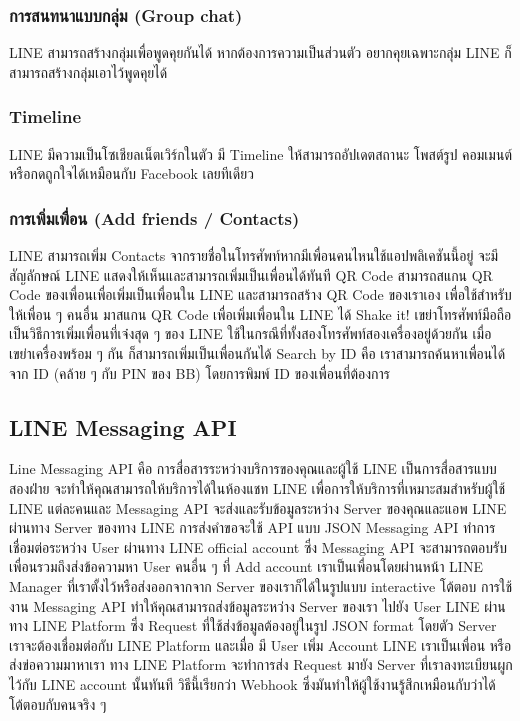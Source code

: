 \subsubsection{การสนทนาแบบกลุ่ม (Group chat)} 
\quad LINE สามารถสร้างกลุ่มเพื่อพูดคุยกันได้ หากต้องการความเป็นส่วนตัว อยากคุยเฉพาะกลุ่ม LINE ก็สามารถสร้างกลุ่มเอาไว้พูดคุยได้ 
\subsubsection{Timeline} 
\quad LINE มีความเป็นโซเชียลเน็ตเวิร์กในตัว มี Timeline ให้สามารถอัปเดตสถานะ โพสต์รูป คอมเมนต์ หรือกดถูกใจได้เหมือนกับ Facebook เลยทีเดียว 
\subsubsection{การเพิ่มเพื่อน (Add friends / Contacts)}
\quad LINE สามารถเพิ่ม Contacts จากรายชื่อในโทรศัพท์หากมีเพื่อนคนไหนใช้แอปพลิเคชันนี้อยู่ จะมีสัญลักษณ์ LINE แสดงให้เห็นและสามารถเพิ่มเป็นเพื่อนได้ทันที QR Code สามารถสแกน QR Code ของเพื่อนเพื่อเพิ่มเป็นเพื่อนใน LINE และสามารถสร้าง QR Code ของเราเอง เพื่อใช้สำหรับให้เพื่อน ๆ คนอื่น มาสแกน QR Code เพื่อเพิ่มเพื่อนใน LINE ได้ Shake it! เขย่าโทรศัพท์มือถือ เป็นวิธีการเพิ่มเพื่อนที่เจ๋งสุด ๆ ของ LINE ใช้ในกรณีที่ทั้งสองโทรศัพท์สองเครื่องอยู่ด้วยกัน เมื่อเขย่าเครื่องพร้อม ๆ กัน ก็สามารถเพิ่มเป็นเพื่อนกันได้ Search by ID คือ เราสามารถค้นหาเพื่อนได้จาก ID (คล้าย ๆ กับ PIN ของ BB) โดยการพิมพ์ ID ของเพื่อนที่ต้องการ 

\subsection{LINE Messaging API} 
\quad Line Messaging API คือ การสื่อสารระหว่างบริการของคุณและผู้ใช้ LINE เป็นการสื่อสารแบบสองฝ่าย จะทำให้คุณสามารถให้บริการได้ในห้องแชท LINE เพื่อการให้บริการที่เหมาะสมสำหรับผู้ใช้ LINE แต่ละคนและ Messaging API จะส่งและรับข้อมูลระหว่าง Server ของคุณและแอพ LINE ผ่านทาง Server ของทาง LINE การส่งคำขอจะใช้ API แบบ JSON Messaging API ทำการเชื่อมต่อระหว่าง User ผ่านทาง LINE official account ซึ่ง Messaging API จะสามารถตอบรับเพื่อนรวมถึงส่งข้อความหา User คนอื่น ๆ ที่ Add account เราเป็นเพื่อนโดยผ่านหน้า LINE Manager ที่เราตั้งไว้หรือส่งออกจากจาก Server ของเราก็ได้ในรูปแบบ interactive โต้ตอบ  การใช้งาน Messaging API ทำให้คุณสามารถส่งข้อมูลระหว่าง Server ของเรา ไปยัง User LINE ผ่านทาง LINE Platform ซึ่ง Request ที่ใช้ส่งข้อมูลต้องอยู่ในรูป JSON format โดยตัว Server เราจะต้องเชื่อมต่อกับ LINE Platform และเมื่อ มี User เพิ่ม Account LINE เราเป็นเพื่อน หรือ ส่งข่อความมาหาเรา ทาง LINE Platform จะทำการส่ง Request มายัง Server ที่เราลงทะเบียนผูกไว้กับ LINE account นั้นทันที วิธีนี้เรียกว่า Webhook ซึ่งมันทำให้ผู้ใช้งานรู้สึกเหมือนกับว่าได้โต้ตอบกับคนจริง ๆ 
\cite{lineAPI}

